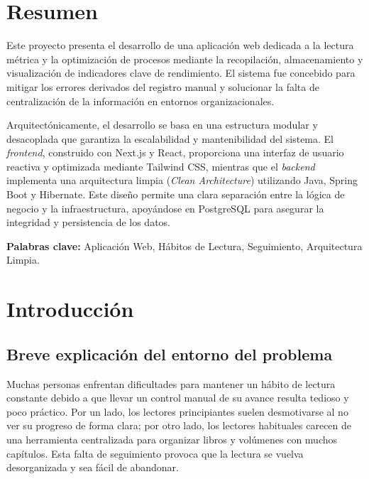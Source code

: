 \documentclass[12pt, atypical, journal]{article}
\begin{document}
\listoffigures
\newpage

\listoftables
\newpage

\section{Resumen}

Este proyecto presenta el desarrollo de una aplicación web dedicada a la lectura métrica y la optimización de procesos mediante la recopilación, almacenamiento y visualización de indicadores clave de rendimiento. El sistema fue concebido para mitigar los errores derivados del registro manual y solucionar la falta de centralización de la información en entornos organizacionales.

Arquitectónicamente, el desarrollo se basa en una estructura modular y desacoplada que garantiza la escalabilidad y mantenibilidad del sistema. El \textit{frontend}, construido con Next.js y React, proporciona una interfaz de usuario reactiva y optimizada mediante Tailwind CSS, mientras que el \textit{backend} implementa una arquitectura limpia (\textit{Clean Architecture}) utilizando Java, Spring Boot y Hibernate. Este diseño permite una clara separación entre la lógica de negocio y la infraestructura, apoyándose en PostgreSQL para asegurar la integridad y persistencia de los datos.

\vspace{0.5cm}
\noindent \textbf{Palabras clave:} Aplicación Web, Hábitos de Lectura, Seguimiento, Arquitectura Limpia.

\section{Introducción}

\subsection{Breve explicación del entorno del problema}
Muchas personas enfrentan dificultades para mantener un hábito de lectura constante debido a que llevar un control manual de su avance resulta tedioso y poco práctico. Por un lado, los lectores principiantes suelen desmotivarse al no ver su progreso de forma clara; por otro lado, los lectores habituales carecen de una herramienta centralizada para organizar libros y volúmenes con muchos capítulos. Esta falta de seguimiento provoca que la lectura se vuelva desorganizada y sea fácil de abandonar.
\end{document}
